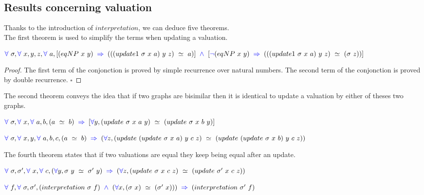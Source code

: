 \documentclass[a4paper]{article}
\begin{document}
\subsection{Results concerning valuation}

Thanks to the introduction of $interpretation$, we can deduce five theorems. \\

The first theorem is used to simplify the terms when updating a valuation.

\begin{theorem}
$\fa \ \sigma, \fa \ x, y, z, \fa \ a, [(eqNP \ x \ y) \ \imp \ (((update1 \ \sigma \ x \ a) \ y \ z) \ \simeq \ a)] \ \conj \ [\blneg(eqNP \ x \ y) \ \imp \ (((update1 \ \sigma \ x \ a) \ y \ z) \ \simeq \ (\sigma \ z))]$
\end{theorem}

\begin{proof}
The first term of the conjonction is proved by simple recurrence over natural numbers. The second term of the conjonction is proved by double recurrence. $\square$
\end{proof}

The second theorem conveys the idea that if two graphs are bisimilar then it is identical to update a valuation by either of theses two graphs.

\begin{theorem}
$\fa \ \sigma, \fa \ x, \fa \ a, b, (a \ \simeq \ b) \ \imp \ [\fa y, (update \ \sigma \ x \ a \ y) \ \simeq \ (update \ \sigma \ x \ b \ y)]$
\end{theorem}

\begin{theorem}
$\fa \ \sigma, \fa \ x, y, \fa \ a, b, c, (a \ \simeq \ b) \ \imp \ (\fa z, (update \ (update \ \sigma \ x \ a) \ y \ c \ z) \ \simeq \ (update \  (update \ \sigma \ x \ b) \ y \ c \ z))$
\end{theorem}

The fourth theorem states that if two valuations are equal they keep being equal after an update.

\begin{theorem}
$\fa \ \sigma, \sigma', \fa \ x, \fa \ c, (\fa y, \sigma \ y \ \simeq \ \sigma' \ y) \ \imp \ (\fa z, (update \ \sigma \ x \ c \ z) \ \simeq \ (update \ \sigma' \ x \ c \ z))$
\end{theorem}

\begin{theorem}
$\fa \ f, \fa \ \sigma, \sigma', (interpretation \ \sigma \ f) \ \conj \ (\fa x, (\sigma \ x) \ \simeq \ (\sigma' \ x))) \ \imp \ (interpretation \ \sigma' \ f)$
\end{theorem}
\end{document}

